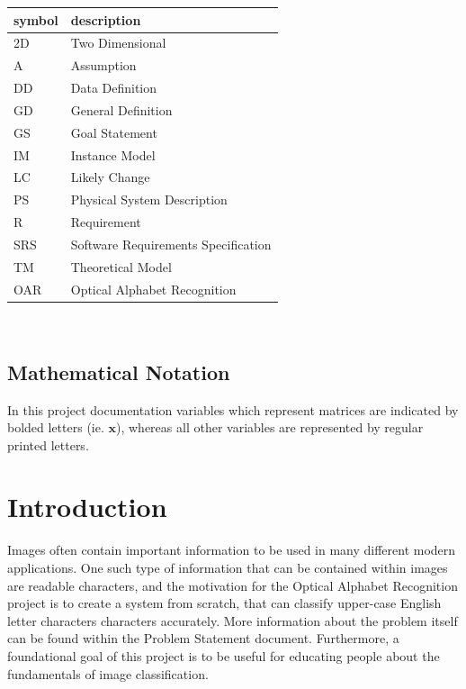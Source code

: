 \documentclass[12pt]{article}
\begin{document}
\renewcommand{\arraystretch}{1.2}
\begin{tabular}{l l} 
  \toprule		
  \textbf{symbol} & \textbf{description}\\
  \midrule 
  2D & Two Dimensional\\
  A & Assumption\\
  DD & Data Definition\\
  GD & General Definition\\
  GS & Goal Statement\\
  IM & Instance Model\\
  LC & Likely Change\\
  PS & Physical System Description\\
  R & Requirement\\
  SRS & Software Requirements Specification\\
  TM & Theoretical Model\\
  OAR & Optical Alphabet Recognition\\
  \bottomrule
\end{tabular}\\

\subsection{Mathematical Notation}

In this project documentation variables which represent matrices are indicated by bolded letters (ie. $\mathbf{x}$), whereas
all other variables are represented by regular printed letters.


\newpage


\section{Introduction}

Images often contain important information to be used in many different modern applications. One such type 
of information that can be contained within images are readable characters, and the motivation for the Optical Alphabet 
Recognition project is to create a system from scratch, that can classify upper-case English letter characters characters accurately.
More information about the problem itself can be found within the Problem Statement document. Furthermore, a foundational goal of
this project is to be useful for educating people about the fundamentals of image classification.
\end{document}
